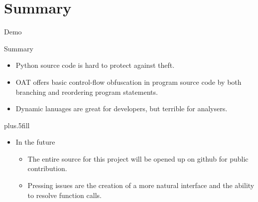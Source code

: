 \section*{Summary}

\begin{frame}{Demo}
\end{frame}

\begin{frame}{Summary}

\begin{itemize}
\item Python source code is \alert{hard to protect} against theft.
\item OAT offers basic control-flow obfuscation in program source code by both \alert{branching} and \alert{reordering} program statements.
\item Dynamic lanuages are great for developers, but terrible for analysers.
\end{itemize}
  
\vskip0pt plus.5fill
\begin{itemize}
\item In the future
\begin{itemize}
\item The entire source for this project will be opened up on github for public contribution.
\item Pressing issues are the creation of a more natural interface and the ability to resolve function calls.
\end{itemize}
\end{itemize}
\end{frame}




